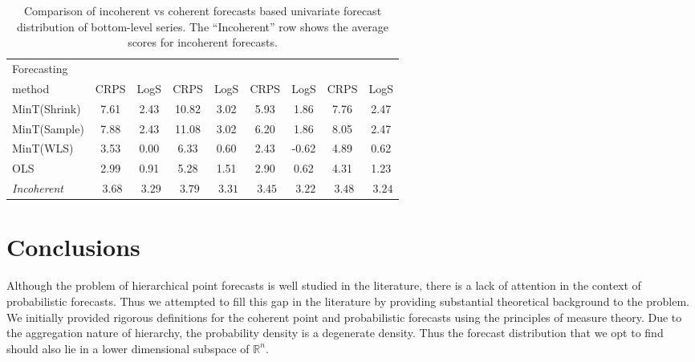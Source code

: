 \documentclass[a4paper, 11pt]{article}
\def\mathbi#1{\textit{ #1}}
\theoremstyle{theo}
\theoremstyle{definition}
\begin{document}
\begin{table}
	\caption{Comparison of incoherent vs coherent forecasts based univariate forecast distribution of bottom-level series. The ``Incoherent'' row shows the average scores for incoherent forecasts.}\label{table:5}
	\centering\tabcolsep=0.08cm\small
	\begin{tabular}{@{}lSSSSSSSS@{}}
		\toprule
		Forecasting &
		 &
		 &
		 &
		 \\
		\cmidrule(lr){2-3} \cmidrule(lr){4-5} \cmidrule(lr){6-7} \cmidrule(l){8-9}
		method       & CRPS   & LogS    & CRPS   & LogS    & CRPS   & LogS    & CRPS   & LogS \\
		\midrule
		MinT(Shrink) &  7.61  &  2.43  &  10.82  &  3.02  &  5.93  &  1.86  &  7.76  & 2.47  \\
		MinT(Sample) &  7.88  &  2.43  &  11.08  &  3.02  &  6.20  &  1.86  &  8.05  & 2.47  \\
		MinT(WLS)    &  3.53  &  0.00  &   6.33  &  0.60  &  2.43  & -0.62  &  4.89  & 0.62  \\
		OLS          &  2.99  &  0.91  &   5.28  &  1.51  &  2.90  &  0.62  &  4.31  & 1.23  \\
		\midrule
		\textit{Incoherent} & $\mathbi{3.68}$ & $\mathbi{3.29}$ & $\mathbi{3.79}$ & $\mathbi{3.31}$ & $\mathbi{3.45}$ & $\mathbi{3.22}$ & $\mathbi{3.48}$ & $\mathbi{3.24}$ \\
		\bottomrule
	\end{tabular}
\end{table}

\section{Conclusions}\label{sec:conclusions}

Although the problem of hierarchical point forecasts is well studied in the literature, there is a lack of attention in the context of probabilistic forecasts. Thus we attempted to fill this gap in the literature by providing substantial theoretical background to the problem. We initially provided rigorous definitions for the coherent point and probabilistic forecasts using the principles of measure theory. Due to the aggregation nature of hierarchy, the probability density is a degenerate density. Thus the forecast distribution that we opt to find should also lie in a lower dimensional subspace of $\mathbb{R}^{n}$.
\end{document}
